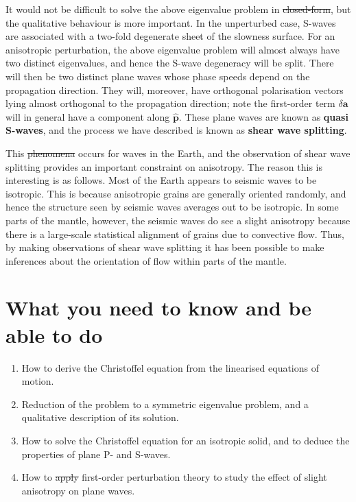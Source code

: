 \documentclass [a4paper,12pt]{paper}
\providecommand{\DIFadd}[1]{{\protect\color{blue}\uwave{#1}}} %
\providecommand{\DIFdel}[1]{{\protect\color{red}\sout{#1}}}                      %
\providecommand{\DIFaddbegin}{} %
\providecommand{\DIFaddend}{} %
\providecommand{\DIFdelbegin}{} %
\providecommand{\DIFdelend}{} %
\begin{document}
It would not be difficult to solve the above eigenvalue problem in \DIFdelbegin \DIFdel{closed-form}\DIFdelend \DIFaddbegin \DIFadd{closed form}\DIFaddend , but the qualitative behaviour is more important. 
In the unperturbed case, S-waves are associated with a two-fold degenerate sheet of the slowness surface. For an 
anisotropic perturbation, the above eigenvalue problem will almost always have two distinct eigenvalues, and hence 
the S-wave degeneracy will be split. 
There will then be two distinct plane waves whose phase speeds depend on the propagation direction. They will, moreover, 
have orthogonal polarisation vectors lying almost orthogonal to the propagation direction; note \DIFaddbegin \DIFadd{that }\DIFaddend the first-order term $\delta 
\mathbf{a}$ will in general have a component 
along $\hat{\mathbf{p}}$. These plane waves are known as \textbf{quasi S-waves}, and the process we have described is 
known as \textbf{shear wave splitting}. 

This \DIFdelbegin \DIFdel{phenomena }\DIFdelend \DIFaddbegin \DIFadd{phenomenon }\DIFaddend occurs for waves in the Earth, and the observation of shear wave 
splitting provides an important constraint on anisotropy. 
The reason this is interesting is as follows. Most of the Earth appears to seismic waves to be isotropic. This is 
because anisotropic grains are generally oriented randomly, and hence the structure seen by seismic waves averages 
out to be isotropic. In some parts of the mantle, however, 
the seismic waves do see a slight anisotropy because there is a large-scale statistical alignment of grains due to 
convective flow. Thus, by making observations of shear wave splitting it has been possible to make inferences about 
the orientation of flow within parts of the mantle.


\section*{What you need to know and be able to do}
\DIFdelbegin %
\DIFdelend \DIFaddbegin \begin{enumerate}
    \DIFaddend \item[(i)] How to derive the Christoffel equation from the linearised equations of motion.
    \item[(ii)] Reduction of the problem to a symmetric eigenvalue problem, and a qualitative description of its solution.
    \item[(iii)] How to solve the Christoffel equation for an isotropic solid, and to deduce the properties of plane P- and S-waves.
    \item[(iv)] How to \DIFdelbegin \DIFdel{apply }\DIFdelend \DIFaddbegin \DIFadd{use }\DIFaddend first-order perturbation theory to study the effect of slight anisotropy on plane waves.
\DIFdelbegin %
\DIFdelend \DIFaddbegin \end{enumerate}
\DIFaddend 
\end{document}
